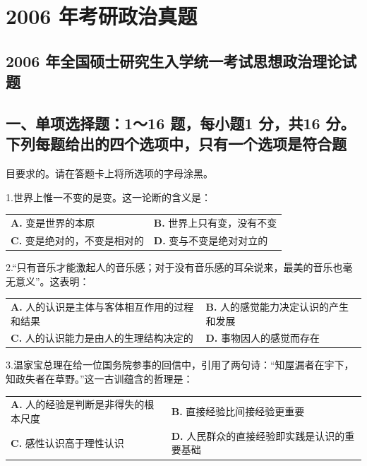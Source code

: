 \documentclass[UTF8,11pt]{ctexart}
\begin{document}
\section*{2006 年考研政治真题}
\subsection*{2006 年全国硕士研究生入学统一考试思想政治理论试题}

\subsection*{一、单项选择题：1～16 题，每小题1 分，共16 分。下列每题给出的四个选项中，只有一个选项是符合题}

目要求的。请在答题卡上将所选项的字母涂黑。


1.世界上惟一不变的是变。这一论断的含义是：


\begin{center}\begin{tabular}{>{\raggedright\arraybackslash}p{\dimexpr(\linewidth-4\tabcolsep)/2\relax}>{\raggedright\arraybackslash}p{\dimexpr(\linewidth-4\tabcolsep)/2\relax}}
\textbf{A.} 变是世界的本原 & \textbf{B.} 世界上只有变，没有不变\\[.35em]
\textbf{C.} 变是绝对的，不变是相对的 & \textbf{D.} 变与不变是绝对对立的\\[.35em]\end{tabular}\end{center}

2.“只有音乐才能激起人的音乐感；对于没有音乐感的耳朵说来，最美的音乐也毫无意义”。这表明：


\begin{center}\begin{tabular}{>{\raggedright\arraybackslash}p{\dimexpr(\linewidth-4\tabcolsep)/2\relax}>{\raggedright\arraybackslash}p{\dimexpr(\linewidth-4\tabcolsep)/2\relax}}
\textbf{A.} 人的认识是主体与客体相互作用的过程和结果 & \textbf{B.} 人的感觉能力决定认识的产生和发展\\[.35em]
\textbf{C.} 人的认识能力是由人的生理结构决定的 & \textbf{D.} 事物因人的感觉而存在\\[.35em]\end{tabular}\end{center}

3.温家宝总理在给一位国务院参事的回信中，引用了两句诗：“知屋漏者在宇下，知政失者在草野。”这一古训蕴含的哲理是：


\begin{center}\begin{tabular}{>{\raggedright\arraybackslash}p{\dimexpr(\linewidth-4\tabcolsep)/2\relax}>{\raggedright\arraybackslash}p{\dimexpr(\linewidth-4\tabcolsep)/2\relax}}
\textbf{A.} 人的经验是判断是非得失的根本尺度 & \textbf{B.} 直接经验比间接经验更重要\\[.35em]
\textbf{C.} 感性认识高于理性认识 & \textbf{D.} 人民群众的直接经验即实践是认识的重要基础\\[.35em]\end{tabular}\end{center}
\end{document}
